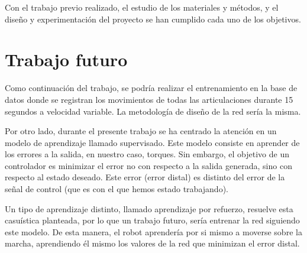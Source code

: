Con el trabajo previo realizado, el estudio de los materiales y métodos, y el diseño y experimentación del proyecto se han cumplido cada uno de los objetivos. 
\section{Trabajo futuro}
Como continuación del trabajo, se podría realizar el entrenamiento en la base de datos donde se registran los movimientos de todas las articulaciones durante 15 segundos a velocidad variable. La metodología de diseño de la red sería la misma.

Por otro lado, durante el presente trabajo se ha centrado la atención en un modelo de aprendizaje llamado supervisado. Este modelo consiste en aprender de los errores a la salida, en nuestro caso, torques. Sin embargo, el objetivo de un controlador es minimizar el error no con respecto a la salida generada, sino con respecto al estado deseado. Este error (error distal) es distinto del error de la señal de control (que es con el que hemos estado trabajando).

Un tipo de aprendizaje distinto, llamado aprendizaje por refuerzo, resuelve esta casuística planteada, por lo que un trabajo futuro, sería entrenar la red siguiendo este modelo. De esta manera, el robot aprendería por si mismo a moverse sobre la marcha, aprendiendo él mismo los valores de la red que minimizan el error distal.